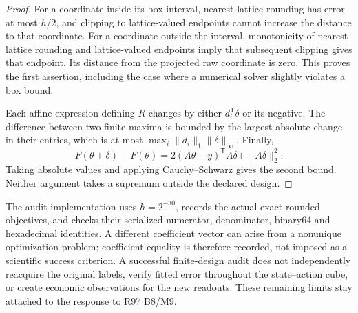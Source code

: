 \begin{proof}
For a coordinate inside its box interval, nearest-lattice rounding has error
at most $h/2$, and clipping to lattice-valued endpoints cannot increase the
distance to that coordinate.  For a coordinate outside the interval,
monotonicity of nearest-lattice rounding and lattice-valued endpoints imply
that subsequent clipping gives that endpoint.  Its distance from the
projected raw coordinate is zero.  This proves the first assertion,
including the case where a numerical solver slightly violates a box bound.

Each affine expression defining $R$ changes by either
$d_i^{\mathsf T}\delta$ or its negative.  The difference between two finite
maxima is bounded by the largest absolute change in their entries, which is
at most $\max_i\|d_i\|_1\|\delta\|_\infty$.  Finally,
\[
 F(\theta+\delta)-F(\theta)
 =2(A\theta-y)^{\mathsf T}A\delta+\|A\delta\|_2^2.
\]
Taking absolute values and applying Cauchy--Schwarz gives the second bound.
Neither argument takes a supremum outside the declared design.
\end{proof}

The audit implementation uses $h=2^{-30}$, records the actual exact rounded
objectives, and checks their serialized numerator, denominator, binary64 and
hexadecimal identities.  A different coefficient vector can arise from a
nonunique optimization problem; coefficient equality is therefore recorded,
not imposed as a scientific success criterion.  A successful finite-design
audit does not independently reacquire the original labels, verify fitted
error throughout the state--action cube, or create economic observations for
the new readouts.  These remaining limits stay attached to the response to
R97 B8/M9.

